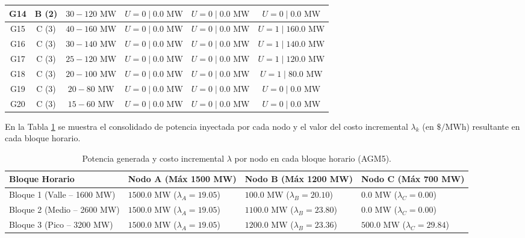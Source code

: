 \documentclass[11pt,letterpaper]{article}
\begin{document}
\begin{table}[H]
{\begin{tabular}{@{}cccccc@{}}
G14 & B (2) & $30 - 120\text{ MW}$  & $U=0 \mid 0.0\text{ MW}$   & $U=0 \mid 0.0\text{ MW}$   & $U=0 \mid 0.0\text{ MW}$   \\ \midrule
G15 & C (3) & $40 - 160\text{ MW}$  & $U=0 \mid 0.0\text{ MW}$   & $U=0 \mid 0.0\text{ MW}$   & $U=1 \mid 160.0\text{ MW}$ \\
G16 & C (3) & $30 - 140\text{ MW}$  & $U=0 \mid 0.0\text{ MW}$   & $U=0 \mid 0.0\text{ MW}$   & $U=1 \mid 140.0\text{ MW}$ \\
G17 & C (3) & $25 - 120\text{ MW}$  & $U=0 \mid 0.0\text{ MW}$   & $U=0 \mid 0.0\text{ MW}$   & $U=1 \mid 120.0\text{ MW}$ \\
G18 & C (3) & $20 - 100\text{ MW}$  & $U=0 \mid 0.0\text{ MW}$   & $U=0 \mid 0.0\text{ MW}$   & $U=1 \mid 80.0\text{ MW}$  \\
G19 & C (3) & $20 - 80\text{ MW}$   & $U=0 \mid 0.0\text{ MW}$   & $U=0 \mid 0.0\text{ MW}$   & $U=0 \mid 0.0\text{ MW}$   \\
G20 & C (3) & $15 - 60\text{ MW}$   & $U=0 \mid 0.0\text{ MW}$   & $U=0 \mid 0.0\text{ MW}$   & $U=0 \mid 0.0\text{ MW}$   \\ \bottomrule
\end{tabular}%
}
\end{table}

En la Tabla \ref{tab:resumen_nodos_lambda} se muestra el consolidado de potencia inyectada por cada nodo y el valor del costo incremental $\lambda_k$ (en $\$/\text{MWh}$) resultante en cada bloque horario.

\begin{table}[H]
\centering
\caption{Potencia generada y costo incremental $\lambda$ por nodo en cada bloque horario (AGM5).}
\label{tab:resumen_nodos_lambda}
\begin{tabular}{@{}l >{\centering\arraybackslash}p{3.8cm} >{\centering\arraybackslash}p{3.8cm} >{\centering\arraybackslash}p{3.8cm}@{}}
\toprule
\textbf{Bloque Horario} & \textbf{Nodo A (Máx 1500 MW)} & \textbf{Nodo B (Máx 1200 MW)} & \textbf{Nodo C (Máx 700 MW)} \\ \midrule
Bloque 1 (Valle -- 1600 MW) & $1500.0\text{ MW}$ ($\lambda_A = 19.05$) & $100.0\text{ MW}$ ($\lambda_B = 20.10$)  & $0.0\text{ MW}$ ($\lambda_C = 0.00$)   \\
Bloque 2 (Medio -- 2600 MW) & $1500.0\text{ MW}$ ($\lambda_A = 19.05$) & $1100.0\text{ MW}$ ($\lambda_B = 23.80$) & $0.0\text{ MW}$ ($\lambda_C = 0.00$)   \\
Bloque 3 (Pico -- 3200 MW)  & $1500.0\text{ MW}$ ($\lambda_A = 19.05$) & $1200.0\text{ MW}$ ($\lambda_B = 23.36$) & $500.0\text{ MW}$ ($\lambda_C = 29.84$) \\ \bottomrule
\end{tabular}
\end{table}
\end{document}
